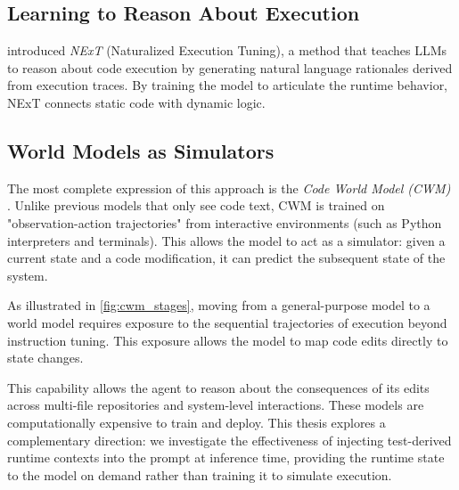 \subsection{Learning to Reason About Execution}
\citet{ni2024nextteachinglargelanguage} introduced \textit{NExT} (Naturalized Execution Tuning),
a method that teaches LLMs to reason about code execution by generating natural language rationales derived from execution traces.
By training the model to articulate the runtime behavior, NExT connects static code with dynamic logic.

\subsection{World Models as Simulators}
The most complete expression of this approach is the \textit{Code World Model (CWM)} \citep{cwm2025}. Unlike previous models that only see code text, CWM is trained on "observation-action trajectories" from interactive environments (such as Python interpreters and terminals). This allows the model to act as a simulator: given a current state and a code modification, it can predict the subsequent state of the system.

As illustrated in \cref{fig:cwm_stages}, moving from a general-purpose model to a world model requires exposure to the sequential trajectories of execution beyond instruction tuning. This exposure allows the model to map code edits directly to state changes.

This capability allows the agent to reason about the consequences of its edits across multi-file repositories and system-level interactions. These models are computationally expensive to train and deploy. This thesis explores a complementary direction: we investigate the effectiveness of injecting test-derived runtime contexts into the prompt at inference time, providing the runtime state to the model on demand rather than training it to simulate execution.
